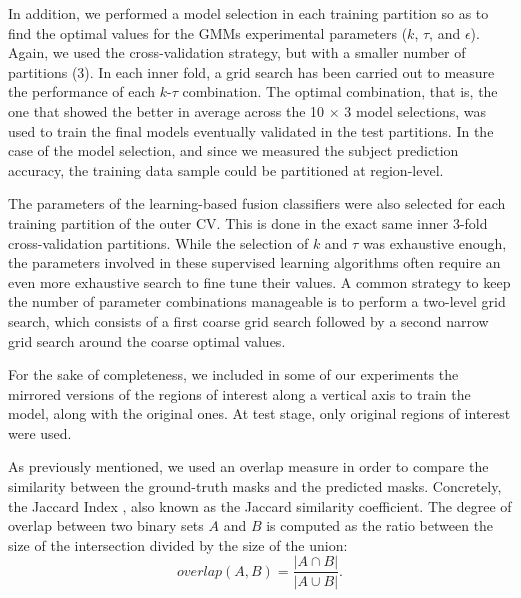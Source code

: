 \documentclass[10pt,twocolumn,letterpaper]{article}
\begin{document}

In addition, we performed a model selection in each training partition so as to find the optimal values for the GMMs experimental parameters ($k$, $\tau$, and $\epsilon$). Again, we used the cross-validation strategy, but with a smaller number of partitions (3). In each inner fold, a grid search has been carried out to measure the performance of each $k$-$\tau$ combination. The optimal combination, that is, the one that showed the better in average across the 10 $\times$ 3 model selections, was used to train the final models eventually validated in the test partitions. In the case of the model selection, and since we measured the subject prediction accuracy, the training data sample could be partitioned at region-level.

The parameters of the learning-based fusion classifiers were also selected for each training partition of the outer CV. This is done in the exact same inner 3-fold cross-validation partitions. While the selection of $k$ and $\tau$ was exhaustive enough, the parameters involved in these supervised learning algorithms often require an even more exhaustive search to fine tune their values. A common strategy to keep the number of parameter combinations manageable is to perform a two-level grid search, which consists of a first coarse grid search followed by a second narrow grid search around the coarse optimal values.

For the sake of completeness, we included in some of our experiments the mirrored versions of the regions of interest along a vertical axis to train the model, along with the original ones.  At test stage, only original regions of interest were used. 


As previously mentioned, we used an overlap measure in order to compare the similarity between the ground-truth masks and the predicted masks. Concretely, the Jaccard Index \cite{tan2002selecting}, also known as the Jaccard similarity coefficient. The degree of overlap between two binary sets $A$ and $B$ is computed as the ratio between the size of the intersection divided by the size of the union:
\begin{equation} \label{eq:jaccard}
overlap(A, B) = \frac{|A \cap B|}{|A \cup B|}.
\end{equation}
\end{document}
